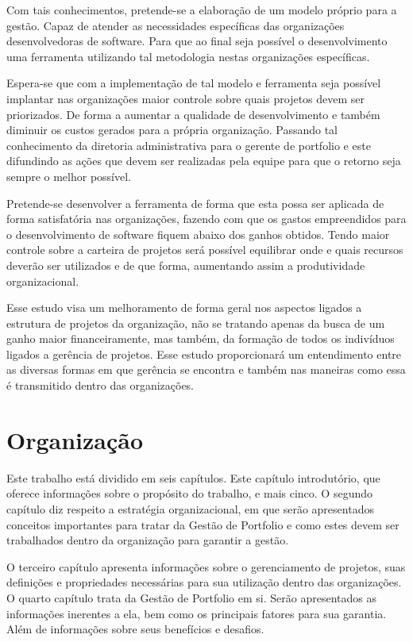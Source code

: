 \documentclass[12pt,a4paper,ruledheader,tocpage=prefix,floatnumber=continuous,pagestart=folhaderosto,font=times]{abnt}
\begin{document}
Com tais conhecimentos, pretende-se a elaboração de um modelo próprio para a gestão. Capaz de atender as necessidades específicas das organizações 
desenvolvedoras de software. Para que ao final seja possível o desenvolvimento uma ferramenta utilizando tal metodologia nestas organizações específicas.

Espera-se que com a implementação de tal modelo e ferramenta seja possível implantar nas organizações maior controle sobre quais projetos devem ser 
priorizados. De forma a aumentar a qualidade de desenvolvimento e também diminuir os custos gerados para a própria organização. Passando tal conhecimento da 
diretoria administrativa para o gerente de portfolio e este difundindo as ações que devem ser realizadas pela equipe para que o retorno seja sempre o melhor 
possível. 

Pretende-se desenvolver a ferramenta de forma que esta possa ser aplicada de forma satisfatória nas organizações, fazendo com que os gastos
empreendidos para o desenvolvimento de software fiquem abaixo dos ganhos obtidos. Tendo maior controle sobre a carteira de projetos será possível
equilibrar onde e quais recursos deverão ser utilizados e de que forma, aumentando assim a produtividade organizacional.

Esse estudo visa um melhoramento de forma geral nos aspectos ligados a estrutura de projetos da organização, não se tratando apenas da busca de um ganho 
maior financeiramente, mas também, da formação de todos os indivíduos ligados a gerência de projetos. Esse estudo proporcionará um entendimento entre as 
diversas formas em que gerência se encontra e também nas maneiras como essa é transmitido dentro das organizações.

\section{Organização}
Este trabalho está dividido em seis capítulos. Este capítulo introdutório, que oferece informações sobre o propósito do trabalho, e mais cinco.
O segundo capítulo diz respeito a estratégia organizacional, em que serão apresentados conceitos importantes para tratar da Gestão de Portfolio e como estes
devem ser trabalhados dentro da organização para garantir a gestão.

O terceiro capítulo apresenta informações sobre o gerenciamento de projetos, suas definições e propriedades necessárias para sua utilização dentro das 
organizações. O quarto capítulo trata da Gestão de Portfolio em si. Serão apresentados as informações inerentes a ela, bem como os principais fatores para sua
garantia. Além de informações sobre seus benefícios e desafios.
\end{document}

